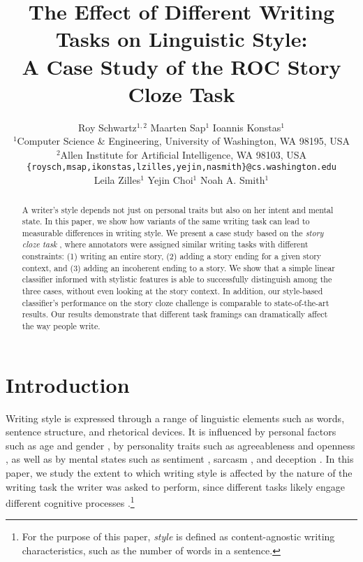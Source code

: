 \documentclass[11pt,a4paper]{article}
\title{The Effect of Different Writing Tasks on Linguistic Style:\\ A Case Study of the ROC Story Cloze Task}
\author{\hspace{2cm}Roy Schwartz$^{1,2}$ \And \hspace{2.5cm}Maarten Sap$^1$ \And \hspace{3cm}Ioannis Konstas$^1$ \And \\
  $^1$Computer Science \& Engineering, University of Washington, WA 98195, USA \\
  $^2$Allen Institute for Artificial Intelligence, WA 98103, USA \\
    {\tt \{roysch,msap,ikonstas,lzilles,yejin,nasmith\}@cs.washington.edu}  \\
    \And \hspace{-2cm}Leila Zilles$^1$ \And \hspace{-2.5cm}Yejin Choi$^1$ \And \hspace{-2.5cm}Noah A. Smith$^1$ \\
  }
\date{}
\newcommand{\resolved}[1]{}
\newcommand{\roy}[1]{{\color{orange}\textsc{[#1 --rs]}}}
\newcommand{\nascomment}[1]{{\color{blue}\textsc{[#1 --nas]}}}
\newcommand{\clinic}[1]{{\color{magenta}\textsc{[#1 --CLINIC]}}}
\renewcommand{\roy}[1]{{\color{orange}[#1 --rs]}}
\renewcommand{\roy}[1]{#1}
\renewcommand{\nascomment}[1]{}
\begin{document}
\maketitle
\begin{abstract}
A writer's style depends not just on personal traits but also on her intent and mental state.
In this paper, we show how variants of the same writing task can lead to measurable differences in writing style.
We present a case study based on 
the  {\it story cloze task} \cite{Mostafazadeh:2016},
where annotators were assigned similar writing tasks with different constraints: (1) writing an entire story, (2) adding a story ending for a given story context, and (3) adding an incoherent ending to a story.\resolved{\clinic{Many felt these 2 constraints looks like 3 constraints. clarify}}
We show that a simple linear classifier informed with stylistic features is able to successfully distinguish among the three cases, without even looking at the story context.
\roy{In addition, our style-based classifier's performance on the story cloze challenge is comparable to state-of-the-art results.} 
Our results demonstrate that different task framings can dramatically affect the way people write.\resolved{\clinic{Similarly to previous comment: which results does this comment address?}}


\resolved{They also provide important lessons for designing new NLP
tasks. \nascomment{drop this sentence if we only have a paragraph
  about this at the end, as we currently do}}

\end{abstract}

\section{Introduction}
Writing style is expressed through a range of linguistic elements such as words, sentence structure, and rhetorical devices.
It is influenced by personal factors such as age and gender \cite{Schler:2006}, 
by personality traits such as agreeableness and openness  \cite{Ireland:2014b},
as well as by mental states\resolved{\clinic{Avoid using ``cognitive"?}} such as sentiment \cite{Davidov:2010}, sarcasm \cite{Tsur:2010}, and deception \cite{Feng:2012}.  
In this paper, we study the extent to which writing style is affected by the nature of the writing task the writer was asked to perform, since
different tasks likely engage different cognitive processes \cite{Campbell:2003,Banerjee:2014}.\roy{\footnote{For the purpose of this paper, \emph{style} is defined as content-agnostic writing characteristics, such as the number of words in a sentence.}}
\end{document}
